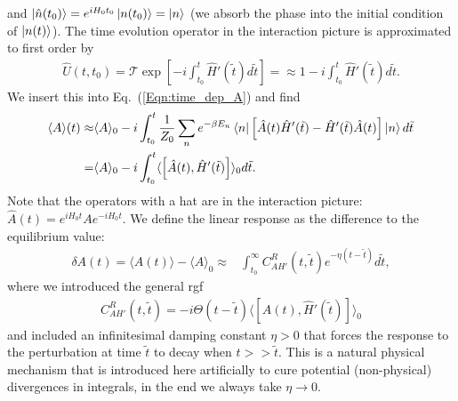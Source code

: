 \documentclass[english]{scrartcl}
\newcommand{\mc}{\mathcal}
\newcommand{\eq}[1]{Eq.~(\ref{#1})}
\begin{document}
and $\ket{\hat n(t_0)} =  e^{i H_0 t_0} \ket{n(t_0)} = \ket{n}$ (we absorb the phase into the initial condition of $\ket{n(t)}$). The time evolution operator in the interaction picture is approximated to first order by
\begin{align*}
\hat U(t, t_0) = \mc T \exp[-i \int_{t_0}^t \hat H'(\tilde t) d\tilde t] = \approx 1 -i \int_{t_0}^t \hat H'(\tilde t) d\tilde t.
\end{align*}
We insert this into \eq{Eqn:time_dep_A} and find  
\begin{align*}
\langle A \rangle (t) \approx& \langle A \rangle_0 - i \int_{t_0}^t \frac{1}{Z_0} \sum_{n} e^{- \beta E_n} \bra{n} \left[\hat A(t) \hat H'(\tilde t) - \hat H'(\tilde t) \hat A(t)\right ] \ket{n} d \tilde t \\
=& \langle A \rangle_0 - i \int_{t_0}^t \langle \left[\hat A (t), \hat H'(\tilde t)\right ] \rangle_0 d \tilde t.
\end{align*}
Note that the operators with a hat are in the interaction picture: $\hat A (t) = e^{i H_0 t} A e^{- i H_0 t}$. We define the linear response as the difference to the equilibrium value:
\begin{align*}
\delta A(t)= \langle A(t) \rangle - \langle A \rangle_0 \approx& \int_{t_0}^\infty C_{AH'}^R (t, \tilde t) e^{-\eta (t - \tilde t)} d \tilde t,
\end{align*}
where we introduced the general \gls{rgf}
\begin{align*}
C_{AH'}^R (t, \tilde t) = -i \Theta (t - \tilde t) \langle \left[\hat A(t), \hat H'(\tilde t)\right ] \rangle_0
\end{align*}
and included an infinitesimal damping constant $\eta > 0$ that forces the response to the perturbation at time $\tilde t$ to decay when $t >>  \tilde t$. This is  a natural physical mechanism that is introduced here artificially to cure potential (non-physical) divergences in integrals, in the end we always take $\eta \to 0$.
\end{document}
